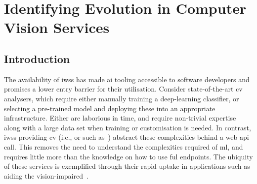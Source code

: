 \chapter[Identifying Evolution in Computer Vision Services]
{Identifying Evolution in Computer Vision Services}
\label{ch:icsme2019}
\graphicspath{{mainmatter/publications/figures/icsme2019/}}

\def \googleapi {A}
\def \azureapi {B}
\def \awsapi {C}

\glsresetall
\begin{abstract}
Recent advances in \gls{ai} and \gls{ml}, such as \gls{cv}, are now available as \glspl{iws} and their accessibility and simplicity is compelling. Multiple vendors now offer this technology as cloud services and developers want to leverage these advances to provide value to end-users. 
However, there is no firm investigation into the maintenance and evolution risks arising from use of these \glspl{iws}; in particular, their behavioural consistency and transparency of their functionality.
We evaluated the responses of three different \glspl{iws} (specifically \gls{cv}) over 11 months using 3 different data sets, verifying responses against the respective documentation and assessing evolution risk. 
We found that there are: (1)~inconsistencies in how these services behave; (2)~evolution risk in the responses; and (3)~a lack of clear communication that documents these risks and inconsistencies.
We propose a set of recommendations to both developers and \gls{iws} providers to inform risk and assist maintainability.
\end{abstract}
\glsresetall

\section{Introduction}

The availability of \glspl{iws} has made \gls{ai} tooling accessible to software developers and promises a lower entry barrier for their utilisation. Consider state-of-the-art \gls{cv} analysers, which require either manually training a deep-learning classifier, or selecting a pre-trained model and deploying these into an appropriate infrastructure. Either are laborious in time, and require non-trivial expertise along with a large data set when training or customisation is needed.
In contrast, \glspl{iws} providing \gls{cv} (i.e.,  or  such as~) abstract these complexities behind a web \gls{api} call. This removes the need to understand the complexities required of \gls{ml}, and requires little more than the knowledge on how to use ful endpoints. The ubiquity of these services is exemplified through their rapid uptake in applications such as aiding the vision-impaired~\citep{Reis:2018cp,daMotaSilveira:2017vp}.

